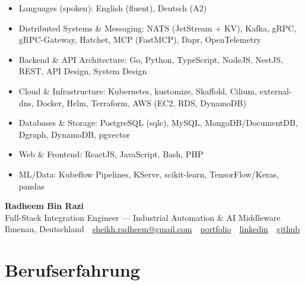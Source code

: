 \documentclass[10pt,a4paper]{resume}
\makeatletter
\newcommand{\Portfolio}{https://radheem.github.io/my-cv}
\newcommand{\PortfolioText}{portfolio}
\newcommand{\GitHub}{https://github.com/radheem}
\newcommand{\LinkedIn}{https://www.linkedin.com/in/radheem-razi}
\newcommand{\Email}{sheikh.radheem@gmail.com}
\makeatother
\begin{document}
\begin{itemize}[leftmargin=1.4em,nosep,topsep=2pt]
  \item Languages (spoken): English (fluent), Deutsch (A2)
  \item Distributed Systems \& Messaging: NATS (JetStream + KV), Kafka, gRPC, gRPC-Gateway, Hatchet, MCP (FastMCP), Dapr, OpenTelemetry
  \item Backend \& API Architecture: Go, Python, TypeScript, NodeJS, NestJS, REST, API Design, System Design
  \item Cloud \& Infrastructure: Kubernetes, kustomize, Skaffold, Cilium, external-dns, Docker, Helm, Terraform, AWS (EC2, RDS, DynamoDB)
  \item Databases \& Storage: PostgreSQL (sqlc), MySQL, MongoDB/DocumentDB, Dgraph, DynamoDB, pgvector
  \item Web \& Frontend: ReactJS, JavaScript, Bash, PHP
  \item ML/Data: Kubeflow Pipelines, KServe, scikit-learn, TensorFlow/Keras, pandas
\end{itemize}

\clearpage
{}

\begin{center}
  {\huge\bfseries Radheem Bin Razi}\\[3pt]
  {\large Full-Stack Integration Engineer — Industrial Automation \& AI Middleware}\\[6pt]
  \small
  Ilmenau, Deutschland \,\textbar\,
  \href{mailto:\Email}{\Email} \,\textbar\,
  \href{\Portfolio}{\PortfolioText} \,\textbar\,
  \href{\LinkedIn}{linkedin} \,\textbar\,
  \href{\GitHub}{github}
\end{center}
\vspace{2pt}

\section{Berufserfahrung}
\end{document}
